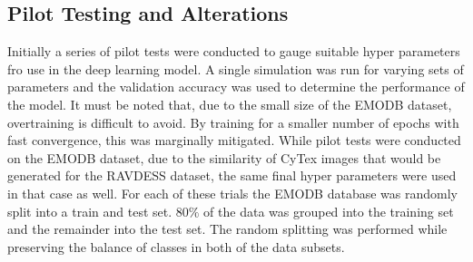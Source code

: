 \subsection{Pilot Testing and Alterations}
Initially a series of pilot tests were conducted to gauge suitable hyper parameters fro use in the deep learning model. A single simulation was run for varying sets of parameters and the validation accuracy was used to determine the performance of the model. It must be noted that, due to the small size of the EMODB dataset, overtraining is difficult to avoid. By training for a smaller number of epochs with fast convergence, this was marginally mitigated. While pilot tests were conducted on the EMODB dataset, due to the similarity of CyTex images that would be generated for the RAVDESS dataset, the same final hyper parameters were used in that case as well. For each of these trials the EMODB database was randomly split into a train and test set. $80\%$ of the data was grouped into the training set and the remainder into the test set. The random splitting was performed while preserving the balance of classes in both of the data subsets.

